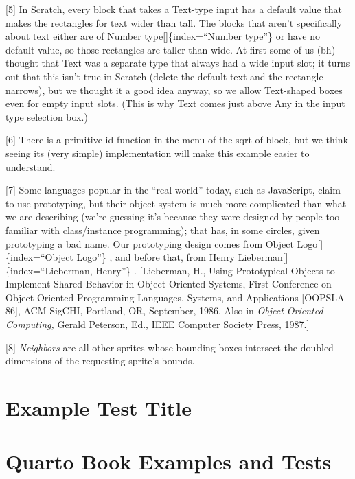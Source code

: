 \documentclass[
  letterpaper,
]{book}
\begin{document}
{[}5{]} In Scratch, every block that takes a Text-type input has a
default value that makes the rectangles for text wider than tall. The
blocks that aren't specifically about text either are of Number
type{[}{]}\{index=``Number type''\} or have no default value, so those
rectangles are taller than wide. At ﬁrst some of us (bh) thought that
Text was a separate type that always had a wide input slot; it turns out
that this isn't true in Scratch (delete the default text and the
rectangle narrows), but we thought it a good idea anyway, so we allow
Text-shaped boxes even for empty input slots. (This is why Text comes
just above Any in the input type selection box.)

{[}6{]} There is a primitive id function in the menu of the sqrt of
block, but we think seeing its (very simple) implementation will make
this example easier to understand.

{[}7{]} Some languages popular in the ``real world'' today, such as
JavaScript, claim to use prototyping, but their object system is much
more complicated than what we are describing (we're guessing it's
because they were designed by people too familiar with class/instance
programming); that has, in some circles, given prototyping a bad name.
Our prototyping design comes from Object Logo{[}{]}\{index=``Object
Logo''\} , and before that, from Henry
Lieberman{[}{]}\{index=``Lieberman, Henry''\} . {[}Lieberman, H., Using
Prototypical Objects to Implement Shared Behavior in Object-Oriented
Systems, First Conference on Object-Oriented Programming Languages,
Systems, and Applications {[}OOPSLA-86{]}, ACM SigCHI, Portland, OR,
September, 1986. Also in \emph{Object-Oriented Computing,} Gerald
Peterson, Ed., IEEE Computer Society Press, 1987.{]}

{[}8{]} \emph{Neighbors} are all other sprites whose bounding boxes
intersect the doubled dimensions of the requesting sprite's bounds.

\chapter{}\label{section-4}

\chapter{Example Test Title}\label{example-test-title}

\chapter{Quarto Book Examples and
Tests}\label{quarto-book-examples-and-tests}
\end{document}
